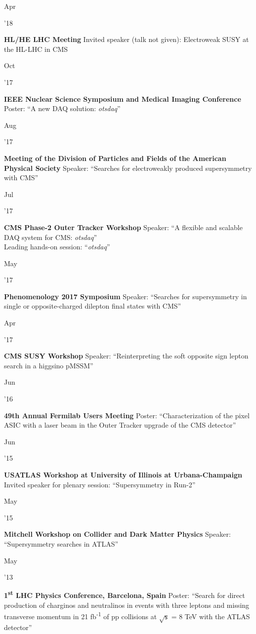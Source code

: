 \documentclass[]{cv} %
\begin{document}
\begin{entrylist}

  \entry
  {\parbox[t]{\parboxWidthOne}{Apr}\parbox[t]{\parboxWidthTwo}{\hfill '18}}
  {\textbf{HL/HE LHC Meeting}}
  {}
  {Invited speaker (talk not given): Electroweak SUSY at the HL-LHC in CMS}

  \entry
  {\parbox[t]{\parboxWidthOne}{Oct}\parbox[t]{\parboxWidthTwo}{\hfill '17}}
  {\textbf{IEEE Nuclear Science Symposium and Medical Imaging Conference}}
  {}
  {Poster: ``A new DAQ solution: \textit{otsdaq}''}

  \entry
  {\parbox[t]{\parboxWidthOne}{Aug}\parbox[t]{\parboxWidthTwo}{\hfill '17}}
  {\textbf{Meeting of the Division of Particles and Fields of the American Physical Society}}
  {}
  {Speaker: ``Searches for electroweakly produced supersymmetry with CMS''}

  \entry
  {\parbox[t]{\parboxWidthOne}{Jul}\parbox[t]{\parboxWidthTwo}{\hfill '17}}
  {\textbf{CMS Phase-2 Outer Tracker Workshop}}
  {}
  {Speaker: ``A flexible and scalable DAQ system for CMS: \textit{otsdaq}''\\
  Leading hands-on session: ``\textit{otsdaq}''}

  \entry
  {\parbox[t]{\parboxWidthOne}{May}\parbox[t]{\parboxWidthTwo}{\hfill '17}}
  {\textbf{Phenomenology 2017 Symposium}}
  {}
  {Speaker: ``Searches for supersymmetry in single or opposite-charged dilepton final states with CMS''}

  \entry
  {\parbox[t]{\parboxWidthOne}{Apr}\parbox[t]{\parboxWidthTwo}{\hfill '17}}
  {\textbf{CMS SUSY Workshop}}
  {}
  {Speaker: ``Reinterpreting the soft opposite sign lepton search in a higgsino pMSSM''}

  \entry
  {\parbox[t]{\parboxWidthOne}{Jun}\parbox[t]{\parboxWidthTwo}{\hfill '16}}
  {\textbf{49th Annual Fermilab Users Meeting}}
  {}
  {Poster: ``Characterization of the pixel ASIC with a laser beam in the Outer Tracker upgrade of the CMS detector''}

  \entry
  {\parbox[t]{\parboxWidthOne}{Jun}\parbox[t]{\parboxWidthTwo}{\hfill '15}}
  {\textbf{USATLAS Workshop at University of Illinois at Urbana-Champaign}}
  {}
  {Invited speaker for plenary session: ``Supersymmetry in Run-2''}

  \entry
  {\parbox[t]{\parboxWidthOne}{May}\parbox[t]{\parboxWidthTwo}{\hfill '15}}
  {\textbf{Mitchell Workshop on Collider and Dark Matter Physics}}
  {}
  {Speaker: ``Supersymmetry searches in ATLAS''}

  \entry
  {\parbox[t]{\parboxWidthOne}{May}\parbox[t]{\parboxWidthTwo}{\hfill '13}}
  {\textbf{1\textsuperscript{st} LHC Physics Conference, Barcelona, Spain}}
  {}
  {Poster: ``Search for direct production of charginos and neutralinos in events with three
    leptons and missing transverse momentum in 21 fb\textsuperscript{-1} of pp collisions at $\sqrt{\mathsf{s}}$ = 8 TeV with the ATLAS
  detector''}


\end{entrylist}
\end{document}
